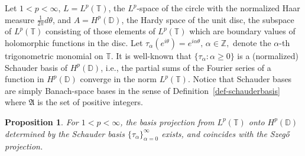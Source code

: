 \documentclass[letterpaper,11pt,reqno]{amsart}
\theoremstyle{plain}
\newtheorem{proposition}[equation]{Proposition}
\theoremstyle{definition}
\theoremstyle{remark}
\theoremstyle{remark}
\numberwithin{equation}{section}
\newcommand{\D}{{\mathbb D}}
\newcommand{\T}{{\mathbb T}}
\newcommand{\Z}{{\mathbb Z}}
\begin{document}
Let $1<p<\infty$, $L=L^p(\T)$, the $L^p$-space of the circle with the normalized Haar measure $\frac{1}{2\pi} d\theta$, and  $A=H^p(\D)$, the Hardy space of the unit disc, the subspace of $L^p(\T)$ consisting of those elements of $L^p(\T)$ which are boundary values of holomorphic functions in the disc. 
Let $\tau_\alpha(e^{i\theta})= e^{i\alpha\theta},\, \alpha\in \Z,$ denote the $\alpha$-th trigonometric monomial on $\T$.
It is well-known that $\{\tau_\alpha: \alpha\geq 0\}$ is a (normalized) Schauder basis of $H^p(\D)$, i.e., the partial sums of the Fourier series of a function in  $H^p(\D)$ converge in the norm $L^p(\T)$. Notice that Schauder bases are simply Banach-space bases in the sense of Definition~\ref{def-schauderbasis} where  $\mathfrak{A}$ is the set of positive integers.
\begin{proposition} \label{prop-szego}
For $1<p<\infty$, the basis projection from $L^p(\T)$ onto $H^p(\D)$ determined by the Schauder basis $\{\tau_\alpha\}_{\alpha=0}^\infty$ exists, and coincides with the Szeg\H{o} projection.
\end{proposition}
\end{document}
